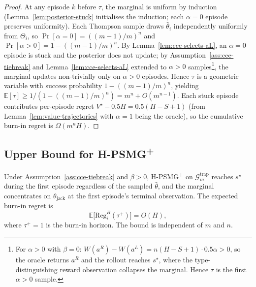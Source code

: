 \begin{proof}
At any episode $k$ before $\tau$, the marginal is uniform by induction (Lemma~\ref{lem:posterior-stuck} initialises the induction; each $\alpha = 0$ episode preserves uniformity). Each Thompson sample draws $\hat\theta_i$ independently uniformly from $\Theta_i$, so $\Pr[\alpha = 0] = ((m-1)/m)^n$ and $\Pr[\alpha > 0] = 1 - ((m-1)/m)^n$. By Lemma~\ref{lem:cce-selects-aL}, an $\alpha = 0$ episode is stuck and the posterior does not update; by Assumption~\ref{ass:cce-tiebreak} and Lemma~\ref{lem:cce-selects-aL} extended to $\alpha > 0$ samples\footnote{For $\alpha > 0$ with $\beta = 0$: $W(a^R) - W(a^L) = n(H - S + 1) \cdot 0.5\alpha > 0$, so the oracle returns $a^R$ and the rollout reaches $s^\star$, where the type-distinguishing reward observation collapses the marginal. Hence $\tau$ is the first $\alpha > 0$ sample.}, the marginal updates non-trivially only on $\alpha > 0$ episodes. Hence $\tau$ is a geometric variable with success probability $1 - ((m-1)/m)^n$, yielding $\mathbb{E}[\tau] \geq 1/(1 - ((m-1)/m)^n) = m^n + O(m^{n-1})$. Each stuck episode contributes per-episode regret $V^\star - 0.5 H = 0.5(H - S + 1)$ (from Lemma~\ref{lem:value-trajectories} with $\alpha = 1$ being the oracle), so the cumulative burn-in regret is $\Omega(m^n H)$.
\end{proof}

\subsection{Upper Bound for H-PSMG\textsuperscript{+}}
\label{app:hpsmg-plus-upper}

\begin{proposition}
\label{prop:hpsmg-plus-burnin}
Under Assumption~\ref{ass:cce-tiebreak} and $\beta > 0$, H-PSMG\textsuperscript{+} on $\mathcal{G}_m^{\mathrm{trap}}$ reaches $s^\star$ during the first episode regardless of the sampled $\hat\theta$, and the marginal concentrates on $\theta_{\mathrm{jack}}$ at the first episode's terminal observation. The expected burn-in regret is
\begin{equation}
\mathbb{E}\big[\mathrm{Reg}_i^B(\tau^+)\big] = O(H),
\end{equation}
where $\tau^+ = 1$ is the burn-in horizon. The bound is independent of $m$ and $n$.
\end{proposition}

